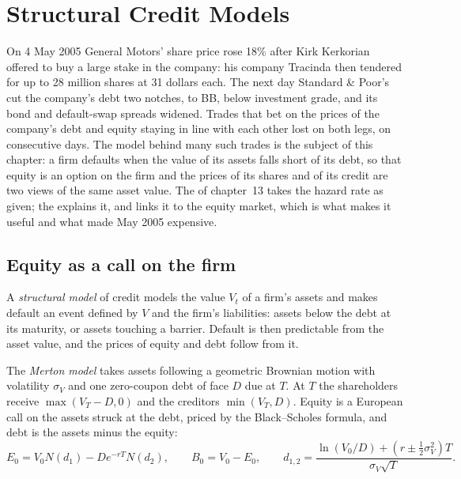 \chapter{Structural Credit Models}\label{ch:rc:structural-credit-models}

On 4 May 2005 General Motors' share price rose 18\% after Kirk Kerkorian offered to buy
a large stake in the company: his company Tracinda then tendered for up to 28 million shares at 31
dollars each. The next day Standard \& Poor's cut the company's debt two
notches, to BB, below investment grade, and its bond and default-swap spreads widened.
Trades that bet on the prices of the company's debt and equity staying in line with each
other lost on both legs, on consecutive days. The model behind many such trades is the
subject of this chapter: a firm defaults when the value of its assets falls short of its
debt, so that equity is an option on the firm and the prices of its shares and of its
credit are two views of the same asset value. The  of chapter~13
takes the hazard rate as given; the  explains it, and links it to the
equity market, which is what makes it useful and what made May 2005 expensive.

\section{Equity as a call on the firm}

\begin{definition}\label{def:rc:structural-credit-models:structural}
A \emph{structural model} of credit models the value $V_t$ of a
firm's assets and makes default an event defined by $V$ and the firm's liabilities:
assets below the debt at its maturity, or assets touching a barrier. Default is then
predictable from the asset value, and the prices of equity and debt follow from it.
\end{definition}

\begin{definition}\label{def:rc:structural-credit-models:merton}
The \emph{Merton model} takes assets following a geometric Brownian
motion with volatility $\sigma_V$ and one zero-coupon debt of face $D$ due at $T$. At $T$
the shareholders receive $\max(V_T-D,0)$ and the creditors $\min(V_T,D)$. Equity is a
European call on the assets struck at the debt, priced by the Black--Scholes formula,
and debt is the assets minus the equity:
\[
E_0 = V_0N(d_1)-De^{-rT}N(d_2),\qquad B_0 = V_0-E_0,\qquad
d_{1,2} = \frac{\ln(V_0/D)+(r\pm\tfrac12\sigma_V^2)T}{\sigma_V\sqrt T}.
\]
\end{definition}

